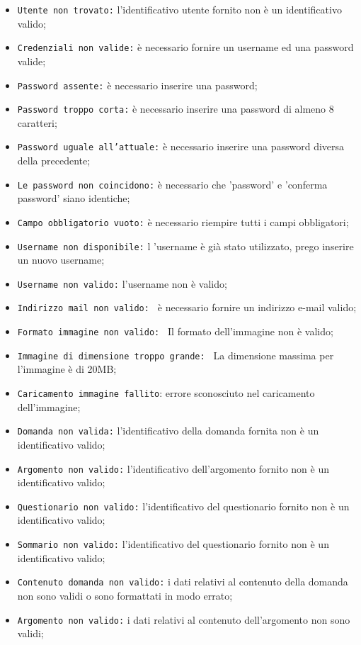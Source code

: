 \begin{itemize}
	\item \texttt{Utente non trovato:} l'identificativo utente fornito non è un identificativo valido;
	\item \texttt{Credenziali non valide:} è necessario fornire un username ed una password valide;
	\item \texttt{Password assente:} è necessario inserire una password;
	\item \texttt{Password troppo corta:} è necessario inserire una password di almeno 8 caratteri;
	\item \texttt{Password uguale all'attuale:} è necessario inserire una password diversa della precedente;
	\item \texttt{Le password non coincidono:} è necessario che 'password' e 'conferma password' siano identiche;
	\item \texttt{Campo obbligatorio vuoto:} è necessario riempire tutti i campi obbligatori;
	\item \texttt{Username non disponibile:} l 'username è già stato utilizzato, prego inserire un nuovo username;
	\item \texttt{Username non valido:} l'username non è valido;
	\item \texttt{Indirizzo mail non valido: } è necessario fornire un indirizzo e-mail valido;
	\item \texttt{Formato immagine non valido: } Il formato dell'immagine non è valido;
	\item \texttt{Immagine di dimensione troppo grande: } La dimensione massima per l'immagine è di 20MB;
	\item \texttt{Caricamento immagine fallito}: errore sconosciuto nel caricamento dell'immagine;
	\item \texttt{Domanda non valida:} l'identificativo della domanda fornita non è un identificativo valido;
	\item \texttt{Argomento non valido:} l'identificativo dell'argomento fornito non è un identificativo valido;
	\item \texttt{Questionario non valido:}  l'identificativo del questionario fornito non è un identificativo valido;
	\item \texttt{Sommario non valido:} l'identificativo del questionario fornito non è un identificativo valido;
	\item \texttt{Contenuto domanda non valido:} i dati relativi al contenuto della domanda non sono  validi o sono formattati in modo errato;
	\item \texttt{Argomento non valido:} i dati relativi al contenuto dell'argomento non sono validi;

\end{itemize}
